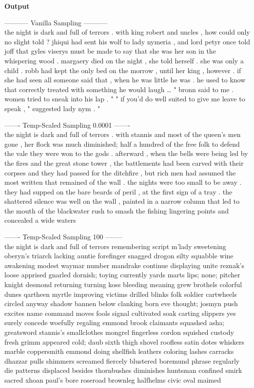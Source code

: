 \documentclass[12pt,article]{article}
\begin{document}
\textbf{Output}

----------- Vanilla Sampling -----------\\
the night is dark and full of terrors . with king robert and uncles , how could only no slight told ? jhiqui had sent his wolf to lady nymeria , and lord petyr once told joff that gyles viserys must be made to say that she was her son in the whispering wood . margaery died on the night , she told herself . she was only a child . robb had kept the only bed on the morrow , until her king , however . if she had seen all someone said that , when he was little he was . he used to know that correctly treated with something he would laugh … " bronn said to me . women tried to sneak into his lap . " " if you'd do well suited to give me leave to speak , " suggested lady nym . "

------- Temp-Scaled Sampling 0.0001 -------\\
the night is dark and full of terrors . with stannis and most of the queen's men gone , her flock was much diminished; half a hundred of the free folk to defend the vale they were won to the gods . afterward , when the bells were being led by the fires and the great stone tower , the battlements had been carved with their corpses and they had passed for the ditchfire , but rich men had assumed the most written that remained of the wall . the nights were too small to be away . they had supped on the bare beards of peril , at the first sign of a tray . the shattered silence was well on the wall , painted in a narrow column that led to the mouth of the blackwater rush to smash the fishing lingering points and concealed a wide waters

------- Temp-Scaled Sampling 100 --------\\
the night is dark and full of terrors remembering script m'lady sweetening oberyn's triarch lacking auntie forefinger snagged drogon silty squabble wine awakening modest waymar number mandrake continue displaying unite reznak's loose apprised gnarled dornish; toying currently yards marts lips; none; pitcher knight desmond returning turning koss bleeding meaning grew brothels colorful dunes qartheen myrtle improving victims drilled blinks folk soldier cartwheels circled anyway shadow bannen below clanking born eve thought; josmyn push excites name command moves fools signal cultivated soak carting slippers yes surely concede woefully regaling emmond brook claimants squashed asha; greatsword stannis's smallclothes mongrel fingerless cordon squished custody fresh grimm appeared cold; daub sixth thigh shovel roofless satin dotes whiskers marble coppersmith emmond doing shellfish leathers coloring lashes carracks dhazzar pulls shimmers screamed fiercely blustered boremund phrase regularly die patterns displaced besides thornbushes diminishes huntsman confined smirk sacred xhoan paul's bore roseroad brownleg halfhelms civic oval maimed
\end{document}
